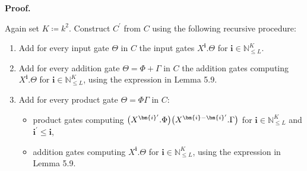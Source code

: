 \par\medskip\noindent\textbf{Proof.}\par




Again set $K\coloneqq k^{2}$.
Construct $C^{\prime}$ from $C$ using the following recursive procedure:



\begin{enumerate}


\item 
 


Add for every input gate $\Theta$
in $C$ the input gates
$X^{\bm{i}}.\Theta$ for ${\bm{i}}\in\mathbb{N}^{K}_{\leq L}$.





\item 
 


Add for every addition gate $\Theta=\Phi+\Gamma$ in $C$ the addition gates computing
$X^{\bm{i}}.\Theta$ for ${\bm{i}}\in\mathbb{N}^{K}_{\leq L}$, using the expression in Lemma 5.9.





\item 
 


Add for every product gate $\Theta=\Phi\Gamma$ in $C$:



\begin{itemize}


\item 
 


product gates computing
$\big{(}X^{{\bm{i}}^{\prime}}.\Phi\big{)}\big{(}X^{{\bm{i}}-{\bm{i}}^{\prime}}.\Gamma\big{)}$
for ${\bm{i}}\in\mathbb{N}^{K}_{\leq L}$ and ${\bm{i}}^{\prime}\leq{\bm{i}}$,





\item 
 


addition gates computing
$X^{\bm{i}}.\Theta$ for ${\bm{i}}\in\mathbb{N}^{K}_{\leq L}$, using the expression in Lemma 5.9.





\end{itemize}





\end{enumerate}
